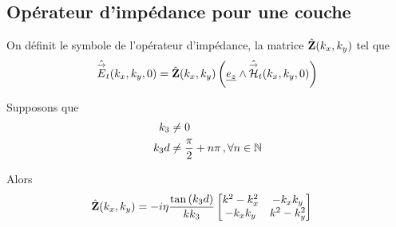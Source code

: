     \subsection{Opérateur d'impédance pour une couche}

        \begin{defn}
            On définit le symbole de l'opérateur d'impédance, la matrice $\hat {\mathbf{Z}}(k_x,k_y)$ tel que 
            \begin{equation}
                \hat {{\overset{\rightarrow}{E}}}_t(k_x,k_y,0) = \hat {\mathbf{Z}}(k_x,k_y) \left(\underline{e_z} \wedge \hat {{\overset{\rightarrow}{\mathcal{H}}}}_t(k_x,k_y,0)\right)
            \end{equation}
        \end{defn}

        \begin{thm}
            Supposons que
            \begin{subequations}
                \label{eq:imp_fourier:plan:hyp_1_c}
                \begin{align}
                    k_3     & \not =0 \\
                    k_3d    & \not = \dfrac{\pi}{2}+n\pi\,, \forall n \in \mathbb N
                \end{align}
            \end{subequations}

            Alors
            \begin{align}
            \hat {\mathbf{Z}}(k_x,k_y) &= -i\eta\dfrac{\tan\left(k_3d\right)}{kk_3}
                \begin{bmatrix}
                   k^2-k_x^2  & -k_xk_y\\
                    -k_xk_y & k^2-k_y^2\\
                \end{bmatrix}
            \end{align}
        \end{thm}

